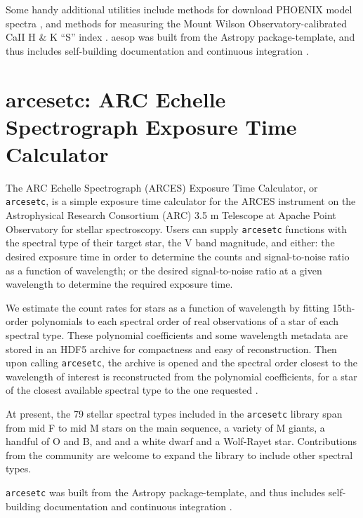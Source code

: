 \documentclass[12pt, twoside]{uwthesis}
\begin{document}
Some handy additional utilities include methods for download PHOENIX model spectra \citep{Husser2013}, and methods for measuring the Mount Wilson Observatory-calibrated CaII H & K ``S'' index \citep{Morris2017b}. aesop was built from the Astropy package-template, and thus includes self-building documentation and continuous integration \citep{Astropy2018}.
 
 \chapter{arcesetc: ARC Echelle Spectrograph Exposure Time Calculator}
 
The ARC Echelle Spectrograph (ARCES) Exposure Time Calculator, or {\tt arcesetc}, is a simple exposure time calculator for the ARCES instrument on the Astrophysical Research Consortium (ARC) 3.5 m Telescope at Apache Point Observatory for stellar spectroscopy. Users can supply {\tt arcesetc} functions with the spectral type of their target star, the V band magnitude, and either: the desired exposure time in order to determine the counts and signal-to-noise ratio as a function of wavelength; or the desired signal-to-noise ratio at a given wavelength to determine the required exposure time.

We estimate the count rates for stars as a function of wavelength by fitting 15th-order polynomials to each spectral order of real observations of a star of each spectral type. These polynomial coefficients and some wavelength metadata are stored in an HDF5 archive for compactness and easy of reconstruction. Then upon calling {\tt arcesetc}, the archive is opened and the spectral order closest to the wavelength of interest is reconstructed from the polynomial coefficients, for a star of the closest available spectral type to the one requested .

At present, the 79 stellar spectral types included in the {\tt arcesetc} library span from mid F to mid M stars on the main sequence, a variety of M giants, a handful of O and B, and and a white dwarf and a Wolf-Rayet star. Contributions from the community are welcome to expand the library to include other spectral
types.

{\tt arcesetc} was built from the Astropy package-template, and thus includes self-building documentation and continuous integration \citep{Astropy2018}.
 

\end{document}
